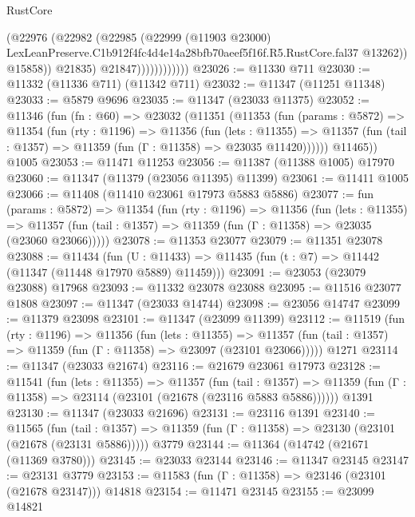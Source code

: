 \begin{lexlean}{RustCore}
\begin{coremodule}
                              (@22976
                                (@22982
                                  (@22985
                                    (@22999
                                      (@11903 @23000)
                                      LexLeanPreserve.C1b912f4fc4d4e14a28bfb70aeef5f16f.R5.RustCore.fal37
                                      @13262))
                                  @15858))
                              @21835)
                            @21847))))))))))))
@23026 := @11330 @711
@23030 := @11332 (@11336 @711) (@11342 @711)
@23032 := @11347 (@11251 @11348)
@23033 := @5879 @9696
@23035 := @11347 (@23033 @11375)
@23052 := @11346
    (fun (fn : @60) =>
    @23032
      (@11351
        (@11353
          (fun (params : @5872) =>
          @11354
            (fun (rty : @1196) =>
            @11356
              (fun (lets : @11355) =>
              @11357 (fun (tail : @1357) => @11359 (fun (Γ : @11358) => @23035 @11420))))))
        @11465))
    @1005
@23053 := @11471 @11253
@23056 := @11387 (@11388 @1005) @17970
@23060 := @11347 (@11379 (@23056 @11395) @11399)
@23061 := @11411 @1005
@23066 := @11408 (@11410 @23061 @17973 @5883 @5886)
@23077 := fun (params : @5872) =>
  @11354
    (fun (rty : @1196) =>
    @11356
      (fun (lets : @11355) =>
      @11357 (fun (tail : @1357) => @11359 (fun (Γ : @11358) => @23035 (@23060 @23066)))))
@23078 := @11353 @23077
@23079 := @11351 @23078
@23088 := @11434
    (fun (U : @11433) => @11435 (fun (t : @7) => @11442 (@11347 (@11448 @17970 @5889) @11459)))
@23091 := @23053 (@23079 @23088) @17968
@23093 := @11332 @23078 @23088
@23095 := @11516 @23077 @1808
@23097 := @11347 (@23033 @14744)
@23098 := @23056 @14747
@23099 := @11379 @23098
@23101 := @11347 (@23099 @11399)
@23112 := @11519
    (fun (rty : @1196) =>
    @11356
      (fun (lets : @11355) =>
      @11357 (fun (tail : @1357) => @11359 (fun (Γ : @11358) => @23097 (@23101 @23066)))))
    @1271
@23114 := @11347 (@23033 @21674)
@23116 := @21679 @23061 @17973
@23128 := @11541
    (fun (lets : @11355) =>
    @11357
      (fun (tail : @1357) =>
      @11359 (fun (Γ : @11358) => @23114 (@23101 (@21678 (@23116 @5883 @5886))))))
    @1391
@23130 := @11347 (@23033 @21696)
@23131 := @23116 @1391
@23140 := @11565
    (fun (tail : @1357) => @11359 (fun (Γ : @11358) => @23130 (@23101 (@21678 (@23131 @5886)))))
    @3779
@23144 := @11364 (@14742 (@21671 (@11369 @3780)))
@23145 := @23033 @23144
@23146 := @11347 @23145
@23147 := @23131 @3779
@23153 := @11583 (fun (Γ : @11358) => @23146 (@23101 (@21678 @23147))) @14818
@23154 := @11471 @23145
@23155 := @23099 @14821

\end{coremodule}
\end{lexlean}

